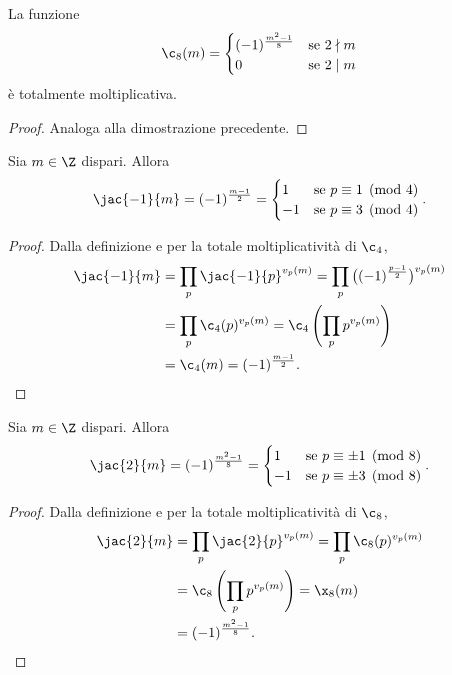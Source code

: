 \begin{lem}
	La funzione
	\[
		\c_8(m) = 	\begin{cases}
			(-1)^{\frac{m^2-1}{8}} & \text{se }2\nmid m \\
			0                      & \text{se }2\mid m
		\end{cases}
	\]
	è totalmente moltiplicativa.
\end{lem}

\begin{proof}
	Analoga alla dimostrazione precedente.
\end{proof}

\begin{pr}
	Sia \(m\in\Z\) dispari.
	Allora
	\[
		\jac{-1}{m} = (-1)^{\frac{m-1}{2}} = 	\begin{cases}
			1  & \text{se }p\equiv 1 \pmod{4} \\
			-1 & \text{se }p\equiv 3 \pmod{4}
		\end{cases}.
	\]
\end{pr}

\begin{proof}
	Dalla definizione e per la totale moltiplicatività di \(\c_4\),
	\[
		\begin{split}
			\jac{-1}{m} & = \prod_p \jac{-1}{p}^{v_p(m)} = \prod_p \big((-1)^{\frac{p-1}{2}}\big)^{v_p(m)}\\
			& = \prod_p \c_4(p)^{v_p(m)} = \c_4 \left( \prod_p p^{v_p(m)} \right)\\
			& = \c_4(m) = (-1)^{\frac{m-1}{2}}.\qedhere
		\end{split}
	\]
\end{proof}

\begin{pr}
	Sia \(m\in\Z\) dispari.
	Allora
	\[
		\jac{2}{m} = (-1)^{\frac{m^2-1}{8}} = 	\begin{cases}
			1  & \text{se }p\equiv \pm 1 \pmod{8} \\
			-1 & \text{se }p\equiv \pm 3 \pmod{8}
		\end{cases}.
	\]
\end{pr}

\begin{proof}
	Dalla definizione e per la totale moltiplicatività di \(\c_8\),
	\[
		\begin{split}
			\jac{2}{m} & = \prod_p \jac{2}{p}^{v_p(m)} = \prod_p \c_8(p)^{v_p(m)}\\
			& = \c_8 \left( \prod_p p^{v_p(m)} \right) = \x_8(m)\\
			& = (-1)^{\frac{m^2-1}{8}}.\qedhere
		\end{split}
	\]
\end{proof}

